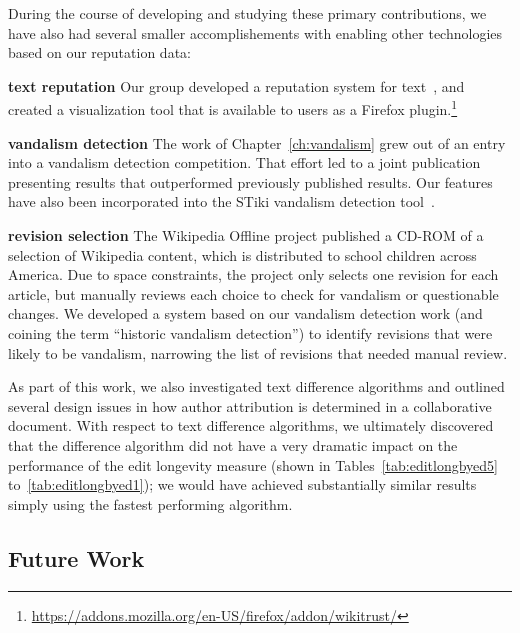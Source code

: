 During the course of developing and studying these primary contributions,
we have also had several smaller accomplishements with enabling other
technologies based on our reputation data:
\begin{description}
\item \textbf{text reputation}
  Our group developed a reputation system for text~\cite{Adler2008b},
  and created a visualization tool that is available to users as a Firefox
  plugin.\footnote{\url{https://addons.mozilla.org/en-US/firefox/addon/wikitrust/}}

\item \textbf{vandalism detection}
  The work of Chapter~\ref{ch:vandalism} grew out of an entry into a
  vandalism detection competition.
  That effort led to a joint publication~\cite{Adler2011a} presenting
  results that outperformed previously published results.
  Our features have also been incorporated
  into the STiki vandalism detection tool~\cite{wiki:STiki}.

\item \textbf{revision selection}
  The Wikipedia Offline project published a CD-ROM of a selection of
  Wikipedia content, which is distributed to school children across
  America.
  Due to space constraints, the project only selects one revision for
  each article, but manually reviews each choice to check for vandalism
  or questionable changes.
  We developed a system based on our vandalism detection work (and
  coining the term ``historic vandalism detection'') to
  identify revisions that were likely to be vandalism, narrowing the
  list of revisions that needed manual review.

\end{description}

As part of this work, we also investigated text difference algorithms
and outlined several design issues in how author attribution is
determined in a collaborative document.
With respect to text difference algorithms, we ultimately discovered
that the difference algorithm did not have a very dramatic impact on the
performance of the edit longevity measure (shown in
Tables~\ref{tab:editlongbyed5} to~\ref{tab:editlongbyed1});
we would have achieved substantially similar results simply using the
fastest performing algorithm.


\subsection{Future Work}

